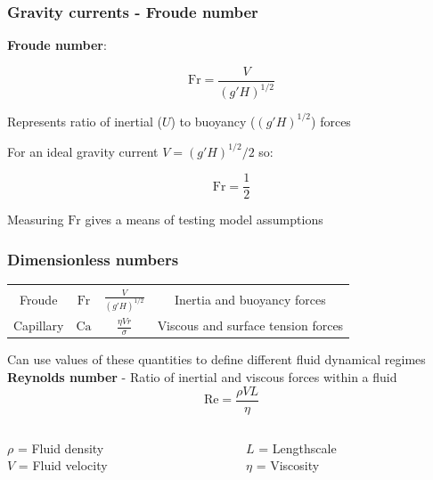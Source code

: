 \documentclass{beamer}
\begin{document}
\begin{frame}
  \frametitle{Gravity currents - Froude number}

  \textbf{Froude number}:

  $$ \text{Fr} = \frac{V}{(g'H)^{1/2}} $$

  Represents ratio of inertial ($U$) to buoyancy ($(g'H)^{1/2}$) forces \\

  \vspace{1cm}
  
  For an ideal gravity current $V = (g' H)^{1/2} / 2$ so:

  $$ \text{Fr} = \frac{1}{2} $$

  Measuring $\text{Fr}$ gives a means of testing model assumptions \\

  
\end{frame}
\begin{frame}
  \frametitle{Dimensionless numbers}

  \centering
  \begin{tabular}{|c|c|c|c|}
    \hline
    Froude & $\text{Fr}$ & $\frac{V}{(g'H)^{1/2}}$ & Inertia and buoyancy forces\\
    Capillary & $\text{Ca}$ & $\frac{\eta V r}{\sigma}$ & Viscous and surface tension forces \\
    \hline
  \end{tabular}

  Can use values of these quantities to define different fluid dynamical regimes \\

  \textbf{Reynolds number} - Ratio of inertial and viscous forces within a fluid \\

  $$ \text{Re} = \frac{\rho V L}{\eta}$$

  \begin{columns}[t]

    \begin{column}{0.5\paperwidth}

      \centering
      
      $\rho$ = Fluid density \\

      $V$ = Fluid velocity
      
    \end{column}

    \begin{column}{0.5\paperwidth}

      \centering
      
      $L$ = Lengthscale \\

      $\eta$ = Viscosity 
    \end{column}
  \end{columns}
  
\end{frame}
\end{document}
